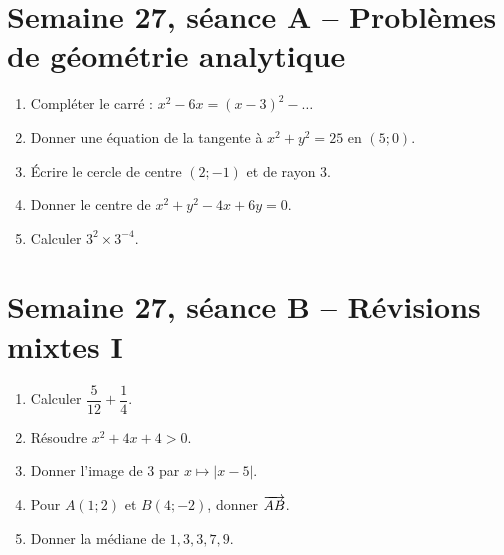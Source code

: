 \section{Semaine 27, séance A -- Problèmes de géométrie analytique}
\begin{enumerate}
  \item Compléter le carré : $x^2-6x=(x-3)^2-\ldots$
  \item Donner une équation de la tangente à $x^2+y^2=25$ en $(5;0)$.
  \item Écrire le cercle de centre $(2;-1)$ et de rayon $3$.
  \item Donner le centre de $x^2+y^2-4x+6y=0$.
  \item Calculer $3^2\times3^{-4}$.
\end{enumerate}

\section{Semaine 27, séance B -- Révisions mixtes I}
\begin{enumerate}
  \item Calculer $\dfrac{5}{12}+\dfrac14$.
  \item Résoudre $x^2+4x+4>0$.
  \item Donner l'image de $3$ par $x\mapsto|x-5|$.
  \item Pour $A(1;2)$ et $B(4;-2)$, donner $\overrightarrow{AB}$.
  \item Donner la médiane de $1,3,3,7,9$.
\end{enumerate}

